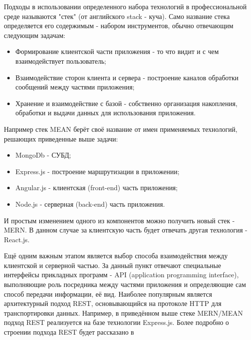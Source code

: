         Подходы в использовании определенного набора технологий в профессиональной среде называются "стек" (от английского stack - куча).
        Само название стека определяется его содержимым - набором инструментов, обычно отвечающим следующим задачам:
        \begin{itemize}
            \item Формирование клиентской части приложения - то что видит и с чем взаимодействует пользователь;
            \item Взаимодействие сторон клиента и сервера - построение каналов обработки сообщений между частями приложения;
            \item Хранение и взаимодействие с базой - собственно организация накопления, обработки и выдачи данных для использования приложения.
        \end{itemize}

        Например стек MEAN берёт своё название от имен применяемых технологий, решающих приведенные выше задачи:
        \begin{itemize}
            \item MongoDb - СУБД;
            \item Express.js - построение маршрутизации в приложении;
            \item Angular.js - клиентская (front-end) часть приложения;
            \item Node.js - серверная (back-end) часть приложения.
        \end{itemize}
        
        И простым изменением одного из компонентов можно получить новый стек - MERN.
        В данном случае за клиентскую часть будет отвечать другая технология - React.js.

        Ещё одним важным этапом является выбор способа взаимодействия между клиентской и серверной частью.
        За данный пункт отвечают специальные интерфейсы прикладных программ - API (application programming interface), выполняющие роль посредника между частями приложения и определяющие сам способ передачи информации, её вид.
        Наиболее популярным является архитектурный подход REST, основывающийся на протоколе HTTP для транспортировки данных.
        Например, в приведённом выше стеке MERN/MEAN подход REST реализуется на базе технологии Express.js.
        Более подробно о строении подхода REST будет рассказано в %

